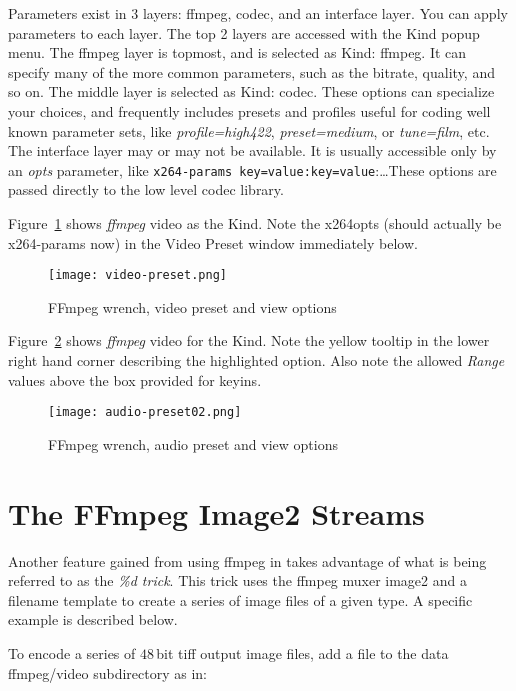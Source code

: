 Parameters exist in 3 layers: ffmpeg, codec, and an interface layer.  You can apply parameters to each layer.  The top 2 layers are accessed with the Kind popup menu. The ffmpeg layer is topmost, and is selected as Kind: ffmpeg.  It can specify many of the more common parameters, such as the bitrate, quality, and so on.  The middle layer is selected as Kind: codec.  These options can specialize your choices, and frequently includes presets and profiles useful for coding well known parameter sets, like \textit{profile=high422}, \textit{preset=medium}, or \textit{tune=film}, etc.   The interface layer may or may not be available.  It is usually accessible only by an \textit{opts} parameter, like \texttt{x264-params key=value:key=value}:\dots  These options are passed directly to the low level codec library.

Figure~\ref{fig:video-preset} shows \textit{ffmpeg} video as the Kind. Note the x264opts (should actually be x264-params now) in the Video Preset window immediately below.

\begin{figure}[htpb]
    \centering
    \texttt{[image: video-preset.png]}
    \caption{FFmpeg wrench, video preset and view options}
    \label{fig:video-preset}
\end{figure}

Figure~\ref{fig:audio-preset02} shows \textit{ffmpeg} video for the Kind. Note the yellow tooltip in the lower right hand corner describing the highlighted option.  Also note the allowed \textit{Range} values above the box provided for keyins.

\begin{figure}[htpb]
    \centering
    \texttt{[image: audio-preset02.png]}
    \caption{FFmpeg wrench, audio preset and view options}
    \label{fig:audio-preset02}
\end{figure}

\section{The FFmpeg Image2 Streams}%
\label{sec:ffmpeg_image2_streams}

Another feature gained from using ffmpeg in \CGG{} takes advantage of what is being referred to as the \textit{\%d trick}.  This trick uses the ffmpeg muxer image2 and a filename template to create a series of image files of a given type.  A specific example is described below.

To encode a series of $48$\,bit tiff output image files, add a file to the \CGG{} data ffmpeg/video subdirectory as in:

